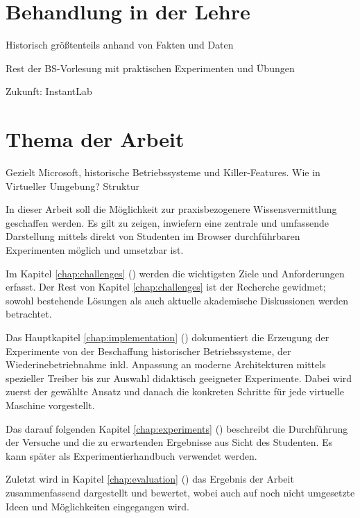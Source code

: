 


\section{Behandlung in der Lehre}
\label{sec:teaching}

	Historisch größtenteils anhand von Fakten und Daten

	Rest der BS-Vorlesung mit praktischen Experimenten und Übungen

	Zukunft: InstantLab
		

\section{Thema der Arbeit}
\label{sec:topic}
				
		
		Gezielt Microsoft, historische Betriebssysteme und Killer-Features. 
		Wie in Virtueller Umgebung?
		Struktur


		In dieser Arbeit soll die Möglichkeit zur praxisbezogenere Wissensvermittlung geschaffen werden. Es gilt zu zeigen, inwiefern eine zentrale und umfassende Darstellung mittels direkt von Studenten im Browser durchführbaren Experimenten möglich und umsetzbar ist.
		
		Im Kapitel \ref{chap:challenges} () werden die wichtigsten Ziele und Anforderungen erfasst. 
		Der Rest von Kapitel \ref{chap:challenges} ist der Recherche gewidmet; sowohl bestehende Lösungen als auch aktuelle akademische Diskussionen werden betrachtet.
		
		Das Hauptkapitel \ref{chap:implementation} () dokumentiert die Erzeugung der Experimente von der Beschaffung historischer Betriebssysteme, der Wiederinebetriebnahme inkl. Anpassung an moderne Architekturen mittels spezieller Treiber bis zur Auswahl didaktisch geeigneter Experimente.
		Dabei wird zuerst der gewählte Ansatz und danach die konkreten Schritte für jede virtuelle Maschine vorgestellt.
		
		Das darauf folgenden Kapitel \ref{chap:experiments} () beschreibt die Durchführung der Versuche und die zu erwartenden Ergebnisse aus Sicht des Studenten. Es kann später als Experimentierhandbuch verwendet werden.

		Zuletzt wird in Kapitel \ref{chap:evaluation} () das Ergebnis der Arbeit zusammenfassend dargestellt und bewertet, wobei auch auf noch nicht umgesetzte Ideen und Möglichkeiten eingegangen wird.
		

